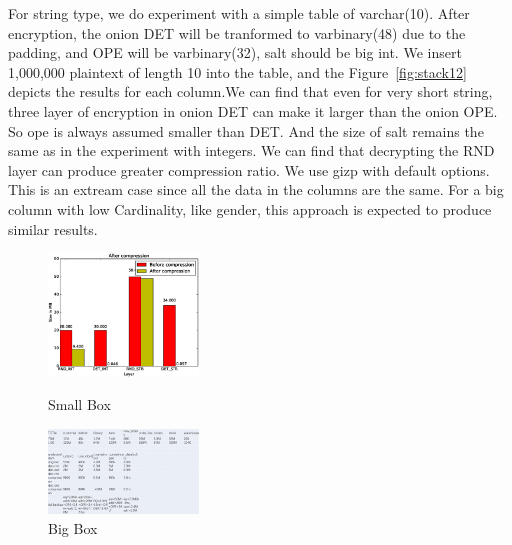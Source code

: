 For string type, we do experiment with a simple table of varchar(10). After encryption, the onion DET will be tranformed to varbinary(48) due to the padding, and OPE will be varbinary(32), salt should be big int. We insert 1,000,000 plaintext of length 10 into the table, and the Figure~\ref{fig:stack12} depicts the results for each column.We can find that even for very short string, three layer of encryption in onion DET can make it larger than the onion OPE. So ope is always assumed  smaller than DET. And the size of salt remains the same as in the experiment with integers. We can find that decrypting the RND layer can produce greater compression ratio. We use gizp with default options. This is an extream case since all the data in the columns are the same. For a big column with low Cardinality, like gender, this approach is expected to produce similar results. 





\begin{figure}   
  \begin{minipage}[t]{0.5\linewidth}  
    \centering   
    \includegraphics[width=4.0cm]{images/aftercompression.eps}   
    \caption{Small Box}   
    \label{fig:side:a}   
  \end{minipage}%
  \begin{minipage}[t]{0.5\linewidth}   
    \centering   
    \includegraphics[width=4.0cm]{images/tpcc.png}   
    \caption{Big Box}   
    \label{fig:side:b}   
  \end{minipage}   
\end{figure}




